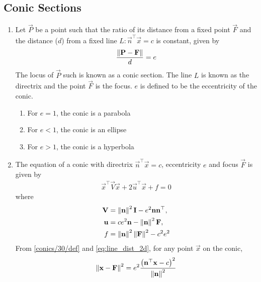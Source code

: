 \documentclass[journal,12pt,twocolumn]{IEEEtran}
\renewcommand\thesection{\arabic{section}}
\renewcommand\thesubsection{\thesection.\arabic{subsection}}
\begin{document}
\subsection{Conic Sections}
\renewcommand{\theequation}{\theenumi}
\begin{enumerate}[label=\thesubsection.\arabic*.,ref=\thesubsection.\theenumi]
\item Let $\vec{P}$ be a point such that the ratio of its distance from a fixed point $\vec{F}$ and the distance ($d$) from a fixed line 
$L: \vec{n}^{\top}\vec{x}=c$ is constant, given by 
\begin{align}
\label{conics/30/def}
\frac{\left\lVert\mathbf{P}-\mathbf{F}\right\rVert}{d} = e    
\end{align}
The locus of $\vec{P}$ such is known as a conic section. The line $L$ is known as the directrix and the point $\vec{F}$ is the focus. $e$ is defined to be 
the eccentricity of the conic.  
\begin{enumerate}
    \item For $e = 1$, the conic is a parabola
    \item For $e < 1$, the conic is an ellipse
    \item For $e > 1$, the conic is a hyperbola
\end{enumerate}
\item The equation of  a conic with directrix $\vec{n}^{\top}\vec{x} = c$, eccentricity $e$ and focus $\vec{F}$ is given by 
\begin{align}
    \label{eq:conic_quad_form}
    \vec{x}^{\top}\vec{V}\vec{x}+2\vec{u}^{\top}\vec{x}+f=0
    \end{align}
where     
\begin{align}
  \label{eq:conic_quad_form_v}
\mathbf{V} &=\left\lVert\mathbf{n}\right\rVert^2\mathbf{I}-e^2\mathbf{n}\mathbf{n}^{\top}, 
\\
\label{eq:conic_quad_form_u}
\mathbf{u} &= ce^2\mathbf{n}-\left\lVert\mathbf{n}\right\rVert^2\mathbf{F}, 
\\
\label{eq:conic_quad_form_f}
f &= \left\lVert\mathbf{n}\right\rVert^2\left\lVert\mathbf{F}\right\rVert^2-c^2e^2
    \end{align}
    \solution  From \eqref{conics/30/def} and \eqref{eq:line_dist_2d},  for any point $\vec{x}$ on the conic,
		\begin{align}	
			\norm{\vec{x}-\vec{F}}^2=e^2 \frac{\brak{{\vec{n}^{\top}\vec{x} - c}}^2}{\norm{\vec{n}}^2}\label{conics/30/eq:1} \\

\end{align}
\end{enumerate}
\end{document}
